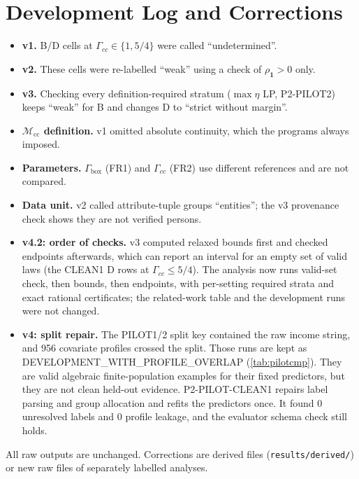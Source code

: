 \documentclass{article}
\theoremstyle{plain}
\theoremstyle{definition}
\theoremstyle{remark}
\newcommand{\one}{\mathbf{1}}
\newcommand{\Dnat}{\Delta_{\mathrm{nat}}}
\newcommand{\Mcc}{\mathcal{M}_{\mathrm{cc}}}
\begin{document}
\section{Development Log and Corrections}
\label{app:devlog}
\begin{itemize}
\item \textbf{v1.} B/D cells at $\Gamma_{cc}\in\{1,5/4\}$ were called
``undetermined''.
\item \textbf{v2.} These cells were re-labelled ``weak'' using a check of
$\rho_{\one}>0$ only.
\item \textbf{v3.} Checking every definition-required stratum
($\max\eta$ LP, P2-PILOT2) keeps ``weak'' for B and changes D to ``strict
without margin''.
\item \textbf{$\Mcc$ definition.} v1 omitted absolute continuity, which the
programs always imposed.
\item \textbf{Parameters.} $\Gamma_{\mathrm{box}}$ (FR1) and $\Gamma_{cc}$ (FR2)
use different references and are not compared.
\item \textbf{Data unit.} v2 called attribute-tuple groups ``entities'';
the v3 provenance check shows they are not verified persons.
\item \textbf{v4.2: order of checks.} v3 computed relaxed bounds first and
checked endpoints afterwards, which can report an interval for an empty set
of valid laws (the CLEAN1 D rows at $\Gamma_{cc}\le5/4$). The analysis now
runs valid-set check, then bounds, then endpoints, with per-setting required
strata and exact rational certificates; the related-work table and the
development runs were not changed.
\item \textbf{v4: split repair.} The PILOT1/2 split key contained the raw
income string, and 956 covariate profiles crossed the split. Those runs are
kept as DEVELOPMENT\_WITH\_PROFILE\_OVERLAP (\cref{tab:pilotcmp}). They are valid
algebraic finite-population examples for their fixed predictors, but they are
not clean held-out evidence. P2-PILOT-CLEAN1 repairs label parsing and group
allocation and refits the predictors once. It found 0 unresolved labels and
0 profile leakage, and the evaluator schema check still holds.
\end{itemize}

\begin{table}[h]
\centering\small
\caption{DEVELOPMENT\_WITH\_PROFILE\_OVERLAP (P2-PILOT1/2, superseded split). Pilot comparison for the same predictors, data and $\Gamma_{cc}$
grid. \emph{expected}: noise-free mask law; \emph{realised}: the one
pre-registered mask draw (finite-population identified sets); \emph{outer}:
conservative 95\% interval from the realised sample. The true $\Dnat$ uses
hidden labels. $\emptyset$ empty; $\pm$ both orders; A$^{s}$ strict; -- not in
the pre-registered outer grid. $\Gamma_{cc}$ column: smallest free-scale value
containing the law (P2-PILOT1, P2-PILOT2).}
\label{tab:pilotcmp}

\end{table}
All raw outputs are unchanged. Corrections are derived files
(\texttt{results/derived/}) or new raw files of separately labelled
analyses.
\end{document}
